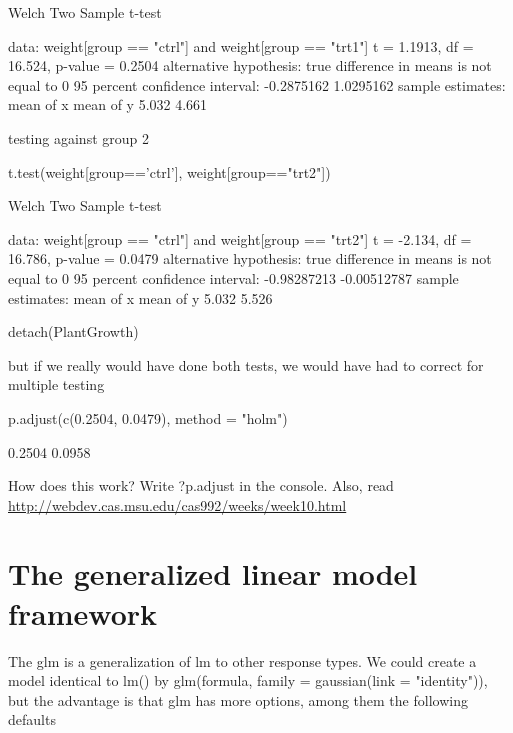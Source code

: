\documentclass[a4paper,twoside]{tufte-book}\usepackage[]{graphicx}\usepackage[]{color}
\begin{document}
{\begin{appendices}
\begin{Schunk}
\begin{Soutput}
	Welch Two Sample t-test

data:  weight[group == "ctrl"] and weight[group == "trt1"]
t = 1.1913, df = 16.524, p-value = 0.2504
alternative hypothesis: true difference in means is not equal to 0
95 percent confidence interval:
 -0.2875162  1.0295162
sample estimates:
mean of x mean of y 
    5.032     4.661 
\end{Soutput}
\end{Schunk}

testing against group 2

\begin{Schunk}
\begin{Sinput}
t.test(weight[group=='ctrl'], weight[group=="trt2"])
\end{Sinput}
\begin{Soutput}

	Welch Two Sample t-test

data:  weight[group == "ctrl"] and weight[group == "trt2"]
t = -2.134, df = 16.786, p-value = 0.0479
alternative hypothesis: true difference in means is not equal to 0
95 percent confidence interval:
 -0.98287213 -0.00512787
sample estimates:
mean of x mean of y 
    5.032     5.526 
\end{Soutput}
\begin{Sinput}
detach(PlantGrowth)
\end{Sinput}
\end{Schunk}

but if we really would have done both tests, we would have had to correct for multiple testing

\begin{Schunk}
\begin{Sinput}
p.adjust(c(0.2504, 0.0479), method = "holm")
\end{Sinput}
\begin{Soutput}
[1] 0.2504 0.0958
\end{Soutput}
\end{Schunk}

How does this work? Write ?p.adjust in the console. Also, read \href{this}{http://webdev.cas.msu.edu/cas992/weeks/week10.html}

\section{The generalized linear model framework}

The glm is a generalization of lm to other response types. We could create a model identical to lm() by glm(formula, family = gaussian(link = "identity")), but the advantage is that glm has more options, among them the following defaults


\end{appendices}}
\end{document}
